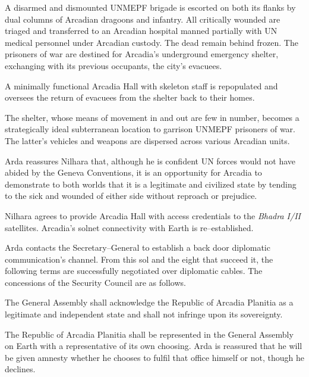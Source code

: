 

A disarmed and dismounted UNMEPF brigade is escorted on both its flanks by dual columns of Arcadian dragoons and infantry. All critically wounded are triaged and transferred to an Arcadian hospital manned partially with UN medical personnel under Arcadian custody. The dead remain behind frozen. The prisoners of war are destined for Arcadia's underground emergency shelter, exchanging with its previous occupants, the city's evacuees. 

A minimally functional Arcadia Hall with skeleton staff is repopulated and oversees the return of evacuees from the shelter back to their homes. 

The shelter, whose means of movement in and out are few in number, becomes a strategically ideal subterranean location to garrison UNMEPF prisoners of war. The latter's vehicles and weapons are dispersed across various Arcadian units.

Arda reassures Nilhara that, although he is confident UN forces would not have abided by the Geneva Conventions, it is an opportunity for Arcadia to demonstrate to both worlds that it is a legitimate and civilized state by tending to the sick and wounded of either side without reproach or prejudice.
\StopTimelineDate

Nilhara agrees to provide Arcadia Hall with access credentials to the {\it Bhadra I/II} satellites. Arcadia's solnet connectivity with Earth is re--established.

Arda contacts the Secretary--General to establish a back door diplomatic communication's channel. From this sol and the eight that succeed it, the following terms are successfully negotiated over diplomatic cables. The concessions of the Security Council are as follows.

\startitemize[R]
\item The General Assembly shall acknowledge the Republic of Arcadia Planitia as a legitimate and independent state and shall not infringe upon its sovereignty.

\item The Republic of Arcadia Planitia shall be represented in the General Assembly on Earth with a representative of its own choosing. Arda is reassured that he will be given amnesty whether he chooses to fulfil that office himself or not, though he declines.

